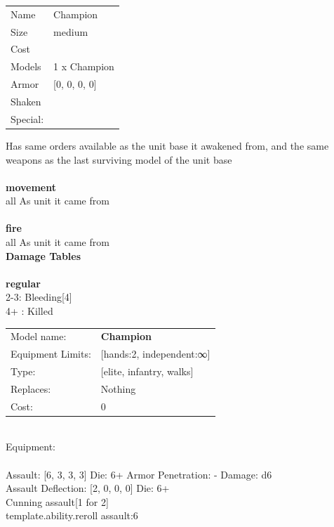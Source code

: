 \begin{tabular}{ll}
  Name & Champion \\
  Size & medium\\
  Cost & \\
  Models & 1 x Champion\\
  Armor & [0, 0, 0, 0]\\
  Shaken & \\
  Special: \\
\end{tabular}

\noindent Has same orders available as the unit base it awakened from, and the same weapons as the last surviving model of the unit base\\ 


\ \\ {\bf movement } \\
all As unit it came from \\
\ \\ {\bf fire } \\
all As unit it came from \\


{\bf Damage Tables} \\
\ \\ {\bf regular } \\
2-3: Bleeding[4] \\
4+ : Killed \\


\noindent
\begin{tabular}{ll}
Model name: &{\bf Champion } \\
Equipment Limits: &[hands:2, independent:∞] \\
Type: &[elite, infantry, walks] \\
Replaces: &Nothing \\
Cost: & 0\\
\end{tabular}
\ \\
Equipment:  \\
\ \\
Assault: [6, 3, 3, 3] Die: 6+ Armor Penetration: - Damage: d6 \\
Assault Deflection: [2, 0, 0, 0] Die: 6+\\
\indent Cunning assault[1 for 2]\\ 
{template.ability.reroll assault:6}\\ 
 
\ \\

\ \\
 

